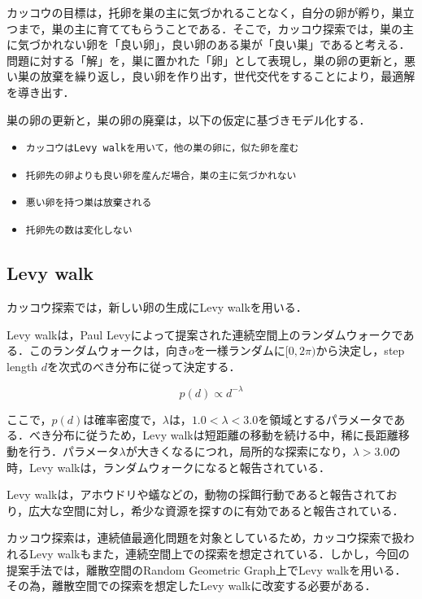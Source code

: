 \documentclass[11pt]{jreport}
\begin{document}
\par カッコウの目標は，托卵を巣の主に気づかれることなく，自分の卵が孵り，巣立つまで，巣の主に育ててもらうことである．そこで，カッコウ探索では，巣の主に気づかれない卵を「良い卵」，良い卵のある巣が「良い巣」であると考える．問題に対する「解」を，巣に置かれた「卵」として表現し，巣の卵の更新と，悪い巣の放棄を繰り返し，良い卵を作り出す，世代交代をすることにより，最適解を導き出す\cite{ohtani}．
\par 巣の卵の更新と，巣の卵の廃棄は，以下の仮定に基づきモデル化する．

\begin{itemize}
	\item {\tt カッコウはLevy walkを用いて，他の巣の卵に，似た卵を産む}
    \item {\tt 托卵先の卵よりも良い卵を産んだ場合，巣の主に気づかれない}
    \item {\tt 悪い卵を持つ巣は放棄される}
    \item {\tt 托卵先の数は変化しない}
\end{itemize}

\subsection{Levy walk}
カッコウ探索では，新しい卵の生成にLevy walkを用いる．
\par Levy walkは，Paul Levyによって提案された連続空間上のランダムウォークである\cite{paul}．このランダムウォークは，向き$o$を一様ランダムに$[0, 2\pi)$から決定し，step length $d$を次式のべき分布に従って決定する．

\begin{equation}
p(d) \propto d^{ -\lambda} \label{exp:levy}
\end{equation}

ここで，$p(d)$は確率密度で，$\lambda$は，$1.0<\lambda<3.0$を領域とするパラメータである．べき分布に従うため，Levy walkは短距離の移動を続ける中，稀に長距離移動を行う．パラメータ$\lambda$が大きくなるにつれ，局所的な探索になり，$\lambda>3.0$の時，Levy walkは，ランダムウォークになると報告されている\cite{sergey}．
\par Levy walkは，アホウドリや蟻などの，動物の採餌行動であると報告されており\cite{andrew}\cite{viswanathan}，広大な空間に対し，希少な資源を探すのに有効であると報告されている\cite{koyama}．
\par カッコウ探索は，連続値最適化問題を対象としているため，カッコウ探索で扱われるLevy walkもまた，連続空間上での探索を想定されている．しかし，今回の提案手法では，離散空間のRandom Geometric Graph上でLevy walkを用いる．その為，離散空間での探索を想定したLevy walkに改変する必要がある．
\end{document}
